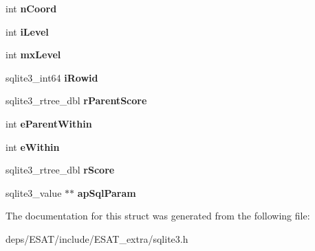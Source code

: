 \begin{DoxyCompactItemize}
int {\bfseries n\+Coord}
\item 
\mbox{\label{structsqlite3__rtree__query__info_af91ca2d5f867b3b0aa9c91920a3b5b45}} 
int {\bfseries i\+Level}
\item 
\mbox{\label{structsqlite3__rtree__query__info_ac84533734fb4c86c3f2deba904118785}} 
int {\bfseries mx\+Level}
\item 
\mbox{\label{structsqlite3__rtree__query__info_a9e43489993c8aeace851f86eaa00ec26}} 
sqlite3\+\_\+int64 {\bfseries i\+Rowid}
\item 
\mbox{\label{structsqlite3__rtree__query__info_af7da93e7fc405eec7e7ec90ab237eab2}} 
sqlite3\+\_\+rtree\+\_\+dbl {\bfseries r\+Parent\+Score}
\item 
\mbox{\label{structsqlite3__rtree__query__info_a8bd37c6af5427c35830f674a4db682c3}} 
int {\bfseries e\+Parent\+Within}
\item 
\mbox{\label{structsqlite3__rtree__query__info_ad1038309f7ea55472a7ff99bf4f9d514}} 
int {\bfseries e\+Within}
\item 
\mbox{\label{structsqlite3__rtree__query__info_af449e4a3607573d17b3d31c67b6e1584}} 
sqlite3\+\_\+rtree\+\_\+dbl {\bfseries r\+Score}
\item 
\mbox{\label{structsqlite3__rtree__query__info_a57ccb3cce45dd946e5184b5addeb0326}} 
sqlite3\+\_\+value $\ast$$\ast$ {\bfseries ap\+Sql\+Param}
\end{DoxyCompactItemize}


The documentation for this struct was generated from the following file\+:\begin{DoxyCompactItemize}
\item 
deps/\+E\+S\+A\+T/include/\+E\+S\+A\+T\+\_\+extra/sqlite3.\+h\end{DoxyCompactItemize}
